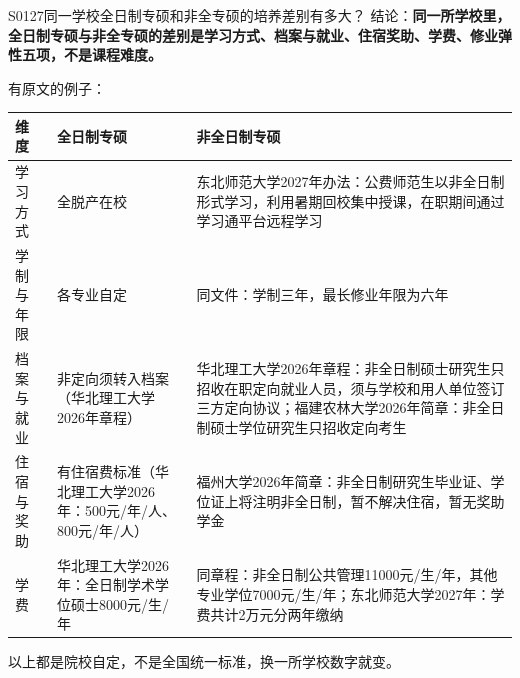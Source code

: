 \begin{qa}{S0127}{同一学校全日制专硕和非全专硕的培养差别有多大？}
结论：\textbf{同一所学校里，全日制专硕与非全专硕的差别是学习方式、档案与就业、住宿奖助、学费、修业弹性五项，不是课程难度。}

有原文的例子：

\par\vspace{2pt}\nobreak\begin{center}\footnotesize
\begin{tabularx}{\textwidth}{>{\raggedright\arraybackslash}X>{\raggedright\arraybackslash}X>{\raggedright\arraybackslash}X}
\toprule
\textbf{维度} & \textbf{全日制专硕} & \textbf{非全日制专硕} \\ \midrule
学习方式 & 全脱产在校 & 东北师范大学2027年办法：公费师范生以非全日制形式学习，利用暑期回校集中授课，在职期间通过学习通平台远程学习 \\
学制与年限 & 各专业自定 & 同文件：学制三年，最长修业年限为六年 \\
档案与就业 & 非定向须转入档案（华北理工大学2026年章程） & 华北理工大学2026年章程：非全日制硕士研究生只招收在职定向就业人员，须与学校和用人单位签订三方定向协议；福建农林大学2026年简章：非全日制硕士学位研究生只招收定向考生 \\
住宿与奖助 & 有住宿费标准（华北理工大学2026年：500元/年/人、800元/年/人） & 福州大学2026年简章：非全日制研究生毕业证、学位证上将注明非全日制，暂不解决住宿，暂无奖助学金 \\
学费 & 华北理工大学2026年：全日制学术学位硕士8000元/生/年 & 同章程：非全日制公共管理11000元/生/年，其他专业学位7000元/生/年；东北师范大学2027年：学费共计2万元分两年缴纳 \\
\bottomrule
\end{tabularx}
\end{center}\vspace{2pt}\par

以上都是院校自定，不是全国统一标准，换一所学校数字就变。
\end{qa}

